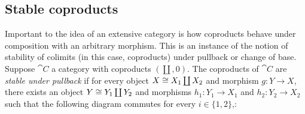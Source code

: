 \subsection{Stable coproducts}
\label{sec:stable-coproducts}

Important to the idea of an extensive category is how coproducts behave under composition with an arbitrary
morphism. This is an instance of the notion of stability of colimits (in this case, coproducts) under pullback
or change of base. Suppose $\cat{C}$ a category with coproducts $(\coprod, 0)$. The coproducts of $\cat{C}$
are \emph{stable under pullback} if for every object $X \cong X_1 \coprod X_2$ and morphism $g: Y \to X$, there
exists an object $Y \cong Y_1 \coprod Y_2$ and morphisms $h_1: Y_1 \to X_1$ and $h_2: Y_2 \to X_2$ such that
the following diagram commutes for every $i \in \{1, 2\}$,:

\begin{center}
\end{center}
